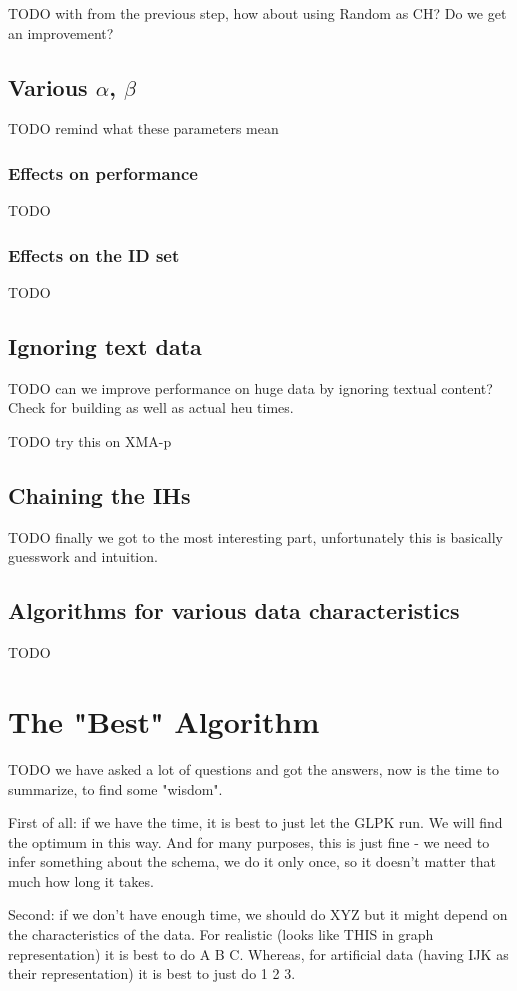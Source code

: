 
TODO with  from the previous step, how about using Random as CH? Do we get an improvement?

\subsection{Various $\alpha$, $\beta$}

TODO remind what these parameters mean

\subsubsection{Effects on performance}

TODO

\subsubsection{Effects on the ID set}

TODO

\subsection{Ignoring text data}

TODO can we improve performance on huge data by ignoring textual content? Check for building as well as actual heu times.

TODO try this on XMA-p

\subsection{Chaining the IHs}

TODO finally we got to the most interesting part, unfortunately this is basically guesswork and intuition.

\subsection{Algorithms for various data characteristics}

TODO

\section{The "Best" Algorithm}

TODO we have asked a lot of questions and got the answers, now is the time to summarize, to find some "wisdom".

First of all: if we have the time, it is best to just let the GLPK run.
We will find the optimum in this way.
And for many purposes, this is just fine - we need to infer something about the schema, we do it only once, so it doesn't matter that much how long it takes.

Second: if we don't have enough time, we should do XYZ but it might depend on the characteristics of the data.
For realistic (looks like THIS in graph representation) it is best to do A B C.
Whereas, for artificial data (having IJK as their representation) it is best to just do 1 2 3.
